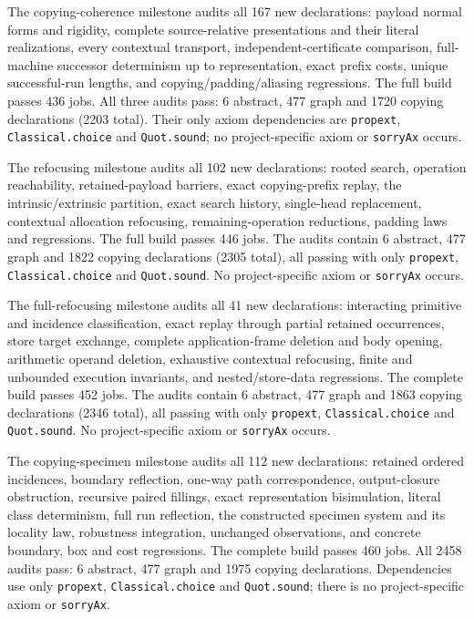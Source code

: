 The copying-coherence milestone audits all 167 new declarations: payload normal
forms and rigidity, complete source-relative presentations and their literal
realizations, every contextual transport, independent-certificate comparison,
full-machine successor determinism up to representation, exact prefix costs,
unique successful-run lengths, and copying/padding/aliasing regressions.
The full build passes 436 jobs. All three audits pass: 6 abstract, 477 graph
and 1720 copying declarations (2203 total). Their only axiom dependencies are
\texttt{propext}, \texttt{Classical.choice} and \texttt{Quot.sound}; no
project-specific axiom or \texttt{sorryAx} occurs.

The refocusing milestone audits all 102 new declarations: rooted search,
operation reachability, retained-payload barriers, exact copying-prefix replay,
the intrinsic/extrinsic partition, exact search history, single-head replacement,
contextual allocation refocusing, remaining-operation reductions, padding laws
and regressions. The full build passes 446 jobs. The audits contain 6 abstract,
477 graph and 1822 copying declarations (2305 total), all passing with only
\texttt{propext}, \texttt{Classical.choice} and \texttt{Quot.sound}.
No project-specific axiom or \texttt{sorryAx} occurs.

The full-refocusing milestone audits all 41 new declarations: interacting
primitive and incidence classification, exact replay through partial retained
occurrences, store target exchange, complete application-frame deletion and
body opening, arithmetic operand deletion, exhaustive contextual refocusing,
finite and unbounded execution invariants, and nested/store-data regressions.
The complete build passes 452 jobs. The audits contain 6 abstract, 477 graph
and 1863 copying declarations (2346 total), all passing with only
\texttt{propext}, \texttt{Classical.choice} and \texttt{Quot.sound}.
No project-specific axiom or \texttt{sorryAx} occurs.


The copying-specimen milestone audits all 112 new declarations: retained
ordered incidences, boundary reflection, one-way path correspondence,
output-closure obstruction, recursive paired fillings, exact representation
bisimulation, literal class determinism, full run reflection, the constructed
specimen system and its locality law, robustness integration, unchanged
observations, and concrete boundary, box and cost regressions. The complete
build passes 460 jobs. All 2458 audits pass: 6 abstract, 477 graph and 1975
copying declarations. Dependencies use only \texttt{propext},
\texttt{Classical.choice} and \texttt{Quot.sound}; there is no project-specific
axiom or \texttt{sorryAx}.


